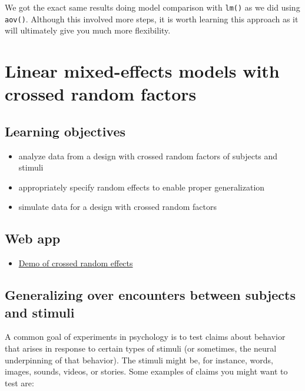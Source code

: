 \documentclass[]{book}
\providecommand{\tightlist}{%
  \setlength{\itemsep}{0pt}\setlength{\parskip}{0pt}}
\begin{document}
We got the exact same results doing model comparison with \texttt{lm()} as we did using \texttt{aov()}. Although this involved more steps, it is worth learning this approach as it will ultimately give you much more flexibility.

\hypertarget{linear-mixed-effects-models-with-crossed-random-factors}{%
\chapter{Linear mixed-effects models with crossed random factors}\label{linear-mixed-effects-models-with-crossed-random-factors}}

\hypertarget{learning-objectives}{%
\section{Learning objectives}\label{learning-objectives}}

\begin{itemize}
\tightlist
\item
  analyze data from a design with crossed random factors of subjects and stimuli
\item
  appropriately specify random effects to enable proper generalization
\item
  simulate data for a design with crossed random factors
\end{itemize}

\hypertarget{web-app}{%
\section{Web app}\label{web-app}}

\begin{itemize}
\tightlist
\item
  \href{https://shiny.psy.gla.ac.uk/Dale/crossed}{Demo of crossed random effects}
\end{itemize}

\hypertarget{generalizing-over-encounters-between-subjects-and-stimuli}{%
\section{Generalizing over encounters between subjects and stimuli}\label{generalizing-over-encounters-between-subjects-and-stimuli}}

A common goal of experiments in psychology is to test claims about behavior that arises in response to certain types of stimuli (or sometimes, the neural underpinning of that behavior). The stimuli might be, for instance, words, images, sounds, videos, or stories. Some examples of claims you might want to test are:
\end{document}
